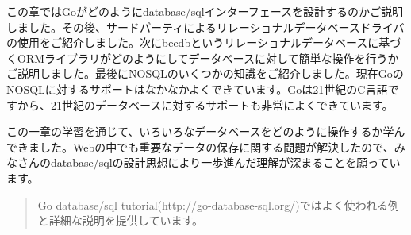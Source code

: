 この章ではGoがどのようにdatabase/sqlインターフェースを設計するのかご説明しました。その後、サードパーティによるリレーショナルデータベースドライバの使用をご紹介しました。次にbeedbというリレーショナルデータベースに基づくORMライブラリがどのようにしてデータベースに対して簡単な操作を行うかご説明しました。最後にNOSQLのいくつかの知識をご紹介しました。現在GoのNOSQLに対するサポートはなかなかよくできています。Goは21世紀のC言語ですから、21世紀のデータベースに対するサポートも非常によくできています。

この一章の学習を通じて、いろいろなデータベースをどのように操作するか学んできました。Webの中でも重要なデータの保存に関する問題が解決したので、みなさんのdatabase/sqlの設計思想により一歩進んだ理解が深まることを願っています。

\begin{quote}
Go database/sql tutorial(http://go-database-sql.org/)ではよく使われる例と詳細な説明を提供しています。
\end{quote}
